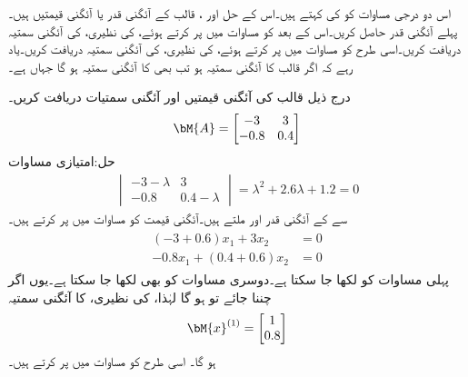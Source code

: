 اس دو درجی مساوات کو  کی  کہتے ہیں۔اس کے حل  اور ، قالب  کے آئگنی قدر یا آئگنی قیمتیں ہیں۔پہلے آئگنی قدر حاصل کریں۔اس کے بعد  کو مساوات  میں پر کرتے ہوئے،  کی نظیری،  کی آئگنی سمتیہ  دریافت کریں۔اسی طرح  کو مساوات  میں پر کرتے ہوئے،  کی نظیری،  کی آئگنی سمتیہ  دریافت کریں۔یاد رہے کہ اگر  قالب  کا آئگنی سمتیہ ہو تب  بھی  کا آئگنی سمتیہ ہو گا جہاں  ہے۔

درج ذیل قالب کی آئگنی قیمتیں اور آئگنی سمتیات دریافت کریں۔
\begin{align*}
\bM{A}=
\begin{bmatrix}
-3& 3\\
-0.8&0.4
\end{bmatrix}
\end{align*}
حل:امتیازی مساوات
\begin{align*}
\begin{vmatrix}
-3-\lambda&3\\
-0.8&0.4-\lambda
\end{vmatrix}=\lambda^2+2.6\lambda+1.2=0
\end{align*}
سے  کے آئگنی قدر  اور  ملتے ہیں۔آئگنی قیمت  کو مساوات  میں پر کرتے ہیں۔
\begin{gather*}
\begin{aligned}
(-3+0.6)x_1+3x_2&=0\\
-0.8x_1+(0.4+0.6)x_2&=0
\end{aligned}
\end{gather*}
پہلی مساوات کو  لکھا جا سکتا ہے۔دوسری مساوات کو بھی  لکھا جا سکتا ہے۔یوں اگر  چننا جائے تو   ہو گا لہٰذا،  کی نظیری،  کا آئگنی سمتیہ 
\begin{align*}
\bM{x}^{(1)}=
\begin{bmatrix}
1\\
0.8
\end{bmatrix}
\end{align*}
ہو گا۔ اسی طرح  کو مساوات  میں پر کرتے ہیں۔
